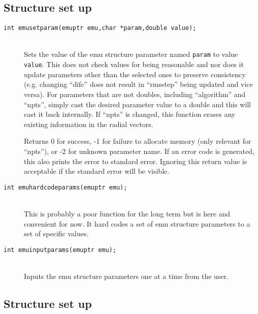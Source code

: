 \documentclass {book}
\begin{document}
\subsection{Structure set up}

\begin{description}

\item[\texttt{int emusetparam(emuptr emu,char *param,double value);}]
\hfill \\
Sets the value of the emu structure parameter named \texttt{param} to value \texttt{value}. This does not check values for being reasonable and nor does it update parameters other than the selected ones to preserve consistency (e.g. changing ``difc'' does not result in ``rmsstep'' being updated and vice versa). For parameters that are not doubles, including ``algorithm'' and ``npts'', simply cast the desired parameter value to a double and this will cast it back internally. If ``npts'' is changed, this function erases any existing information in the radial vectors.

Returns 0 for success, -1 for failure to allocate memory (only relevant for ``npts''), or -2 for unknown parameter name.  If an error code is generated, this also prints the error to standard error. Ignoring this return value is acceptable if the standard error will be visible.

\item[\texttt{int emuhardcodeparams(emuptr emu);}]
\hfill \\
This is probably a poor function for the long term but is here and convenient for now. It hard codes a set of emu structure parameters to a set of specific values.

\item[\texttt{int emuinputparams(emuptr emu);}]
\hfill \\
Inputs the emu structure parameters one at a time from the user.

\end{description}

\subsection{Structure set up}
\end{document}
